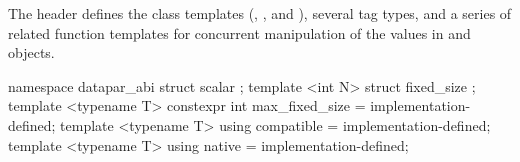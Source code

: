

\pnum
The header  defines the class templates (\datapar, \mask, and ), several tag types, and a series of related function templates for concurrent manipulation of the values in \datapar and \mask objects.


\begin{itemdecl}
namespace datapar_abi {
  struct scalar {};
  template <int N> struct fixed_size {};
  template <typename T> constexpr int max_fixed_size = implementation-defined;
  template <typename T> using compatible = implementation-defined;
  template <typename T> using native = implementation-defined;
}
\end{itemdecl}

